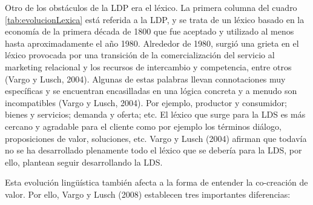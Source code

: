 Otro de los obstáculos de la LDP era el léxico. La primera columna del cuadro \ref{tab:evolucionLexica} está referida a la LDP, y se trata de un léxico basado en la economía de la primera década de 1800 que fue aceptado y utilizado al menos hasta aproximadamente el año 1980. Alrededor de 1980, surgió una grieta en el léxico provocada por una transición de la comercialización del servicio al marketing relacional y los recursos de intercambio y competencia, entre otros (Vargo y Lusch, 2004). Algunas de estas palabras llevan connotaciones muy específicas y se encuentran encasilladas en una lógica concreta y a menudo son incompatibles (Vargo y Lusch, 2004). Por ejemplo, productor y consumidor; bienes y servicios; demanda y oferta; etc. El léxico que surge para la LDS es más cercano y agradable para el cliente como por ejemplo los términos diálogo, proposiciones de valor, soluciones, etc. Vargo y Lusch (2004) afirman que todavía no se ha desarrollado plenamente todo el léxico que se debería para la LDS, por ello, plantean seguir desarrollando la LDS. 



Esta evolución lingüística también afecta a la forma de entender la co-creación de valor. Por ello, Vargo y Lusch (2008) establecen tres importantes diferencias:


